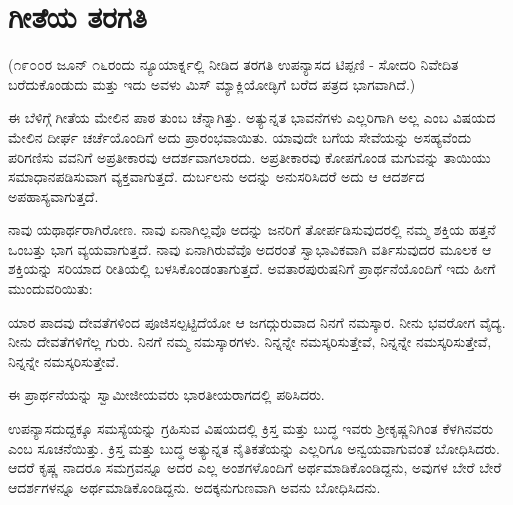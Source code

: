 
\chapter{ಗೀತೆಯ ತರಗತಿ}

(೧೯೦೦ರ ಜೂನ್ ೧೬ರಂದು ನ್ಯೂಯಾರ್ಕ್ನಲ್ಲಿ ನೀಡಿದ ತರಗತಿ ಉಪನ್ಯಾಸದ ಟಿಪ್ಪಣಿ - ಸೋದರಿ ನಿವೇದಿತ ಬರೆದುಕೊಂಡುದು ಮತ್ತು ಇದು ಅವಳು ಮಿಸ್ ಮ್ಯಾಕ್ಲಿಯೋಡ್ಳಿಗೆ ಬರೆದ ಪತ್ರದ ಭಾಗವಾಗಿದೆ.)

ಈ ಬೆಳಿಗ್ಗೆ ಗೀತೆಯ ಮೇಲಿನ ಪಾಠ ತುಂಬ ಚೆನ್ನಾಗಿತ್ತು. ಅತ್ಯುನ್ನತ ಭಾವನೆಗಳು ಎಲ್ಲರಿಗಾಗಿ ಅಲ್ಲ ಎಂಬ ವಿಷಯದ ಮೇಲಿನ ದೀರ್ಘ ಚರ್ಚೆಯೊಂದಿಗೆ ಅದು ಪ್ರಾರಂಭವಾಯಿತು. ಯಾವುದೇ ಬಗೆಯ ಸೇವೆಯನ್ನು ಅಸಹ್ಯವೆಂದು ಪರಿಗಣಿಸು ವವನಿಗೆ ಅಪ್ರತೀಕಾರವು ಆದರ್ಶವಾಗಲಾರದು. ಅಪ್ರತೀಕಾರವು ಕೋಪಗೊಂಡ ಮಗುವನ್ನು ತಾಯಿಯು ಸಮಾಧಾನಪಡಿಸುವಾಗ ವ್ಯಕ್ತವಾಗುತ್ತದೆ. ದುರ್ಬಲನು ಅದನ್ನು ಅನುಸರಿಸಿದರೆ ಅದು ಆ ಆದರ್ಶದ ಅಪಹಾಸ್ಯವಾಗುತ್ತದೆ.

ನಾವು ಯಥಾರ್ಥರಾಗಿರೋಣ. ನಾವು ಏನಾಗಿಲ್ಲವೊ ಅದನ್ನು ಜನರಿಗೆ ತೋರ್ಪಡಿಸುವುದರಲ್ಲಿ ನಮ್ಮ ಶಕ್ತಿಯ ಹತ್ತನೆ ಒಂಬತ್ತು ಭಾಗ ವ್ಯಯವಾಗುತ್ತದೆ. ನಾವು ಏನಾಗಿರುವೆವೊ ಅದರಂತೆ ಸ್ವಾಭಾವಿಕವಾಗಿ ವರ್ತಿಸುವುದರ ಮೂಲಕ ಆ ಶಕ್ತಿಯನ್ನು ಸರಿಯಾದ ರೀತಿಯಲ್ಲಿ ಬಳಸಿಕೊಂಡಂತಾಗುತ್ತದೆ. ಅವತಾರಪುರುಷನಿಗೆ ಪ್ರಾರ್ಥನೆಯೊಂದಿಗೆ ಇದು ಹೀಗೆ ಮುಂದುವರಿಯಿತು:

ಯಾರ ಪಾದವು ದೇವತೆಗಳಿಂದ ಪೂಜಿಸಲ್ಪಟ್ಟಿದೆಯೋ ಆ ಜಗದ್ಗುರುವಾದ ನಿನಗೆ ನಮಸ್ಕಾರ. ನೀನು ಭವರೋಗ ವೈದ್ಯ. ನೀನು ದೇವತೆಗಳಿಗೆಲ್ಲ ಗುರು. ನಿನಗೆ ನಮ್ಮ ನಮಸ್ಕಾರಗಳು. ನಿನ್ನನ್ನೇ ನಮಸ್ಕರಿಸುತ್ತೇವೆ, ನಿನ್ನನ್ನೇ ನಮಸ್ಕರಿಸುತ್ತೇವೆ, ನಿನ್ನನ್ನೇ ನಮಸ್ಕರಿಸುತ್ತೇವೆ.

ಈ ಪ್ರಾರ್ಥನೆಯನ್ನು ಸ್ವಾಮೀಜೀಯವರು ಭಾರತೀಯರಾಗದಲ್ಲಿ ಪಠಿಸಿದರು.

ಉಪನ್ಯಾಸದುದ್ದಕ್ಕೂ ಸಮಸ್ಯೆಯನ್ನು ಗ್ರಹಿಸುವ ವಿಷಯದಲ್ಲಿ ಕ್ರಿಸ್ತ ಮತ್ತು ಬುದ್ಧ ಇವರು ಶ‍್ರೀಕೃಷ್ಣನಿಗಿಂತ ಕೆಳಗಿನವರು ಎಂಬ ಸೂಚನೆಯಿತ್ತು. ಕ್ರಿಸ್ತ ಮತ್ತು ಬುದ್ಧ ಅತ್ಯುನ್ನತ ನೈತಿಕತೆಯನ್ನು ಎಲ್ಲರಿಗೂ ಅನ್ವಯವಾಗುವಂತೆ ಬೋಧಿಸಿದರು. ಆದರೆ ಕೃಷ್ಣ ನಾದರೂ ಸಮಗ್ರವನ್ನೂ ಅದರ ಎಲ್ಲ ಅಂಶಗಳೊಂದಿಗೆ ಅರ್ಥಮಾಡಿಕೊಂಡಿದ್ದನು, ಅವುಗಳ ಬೇರೆ ಬೇರೆ ಆದರ್ಶಗಳನ್ನೂ ಅರ್ಥಮಾಡಿಕೊಂಡಿದ್ದನು. ಅದಕ್ಕನುಗುಣವಾಗಿ ಅವನು ಬೋಧಿಸಿದನು.

